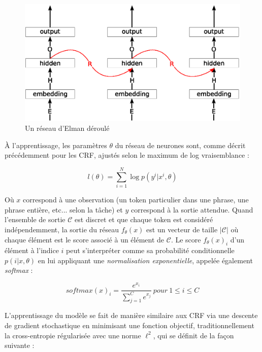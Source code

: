 \documentclass[PhD-Yoann-Dupont.tex]{subfiles}
\begin{document}
\begin{figure}[ht!]
\centering
\includegraphics[scale=0.75]{images/NN/Elman-unrolled}
\caption{Un réseau d'Elman déroulé}
\label{fig:unrolled-RNN}
\end{figure}

À l'apprentissage, les paramètres $\theta$ du réseau de neurones sont, comme décrit précédemment pour les CRF, ajustés selon le maximum de log vraisemblance :

\begin{equation} \label{eq:NN-log-likelihood}
l(\theta) = \sum_{i=1}^{N} \log p(y^{i} | x^{i}, \theta)
\end{equation}

Où $x$ correspond à une observation (un token particulier dans une phrase, une phrase entière, etc... selon la tâche) et $y$ correspond à la sortie attendue. Quand l'ensemble de sortie $\mathcal{C}$ est discret et que chaque token est considéré indépendemment, la sortie du réseau $f_{\theta}(x)$ est un vecteur de taille $|\mathcal{C}|$ où chaque élément est le score associé à un élément de $\mathcal{C}$. Le score $f_{\theta}(x)_{i}$ d'un élément à l'indice $i$ peut s'interpréter comme sa probabilité conditionnelle $p(i|x,\theta)$ en lui appliquant une \emph{normalisation exponentielle}, appelée également \emph{softmax} :

\begin{equation} \label{eq:softmax}
softmax(x)_{i} = \frac{e^{x_{i}}}{\sum_{j=1}^{C}e^{x_{j}}}\ pour\ 1 \leq i \leq C
\end{equation}

L'apprentissage du modèle se fait de manière similaire aux CRF via une descente de gradient stochastique en minimisant une fonction objectif, traditionnellement la cross-entropie régularisée avec une norme $\ell^{2}$, qui se définit de la façon suivante :
\end{document}
